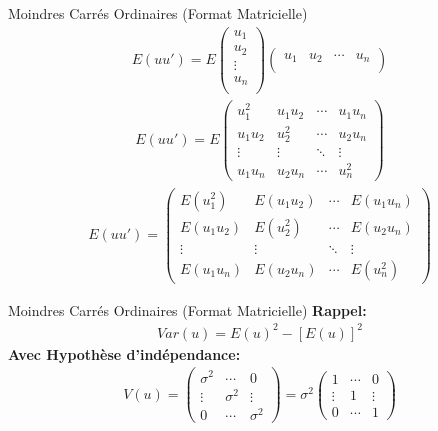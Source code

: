 \documentclass{beamer}
\begin{document}
\begin{frame}{Moindres Carrés Ordinaires (Format Matricielle)}
\begin{align*}
E(uu')=E\begin{pmatrix}
u_1\\ 
u_2\\ 
\vdots\\
u_n\\
\end{pmatrix} \begin{pmatrix}
u_1 &u_2 & \cdots &u_n\\ 
\end{pmatrix}
\end{align*}
\begin{align*}
E(uu')=E\begin{pmatrix}
u_1^2 & u_1 u_2 & \cdots &u_1u_n\\ 
u_1u_2 &u_2^2 & \cdots & u_2u_n\\ 
\vdots & \vdots & \ddots & \vdots \\
u_1u_n & u_2u_n & \cdots & u_n^2
\end{pmatrix} 
\end{align*}
\begin{align*}
E(uu')=\begin{pmatrix}
E(u_1^2) & E(u_1 u_2) & \cdots &E(u_1u_n)\\ 
E(u_1u_2) &E(u_2^2) & \cdots & E(u_2u_n)\\ 
\vdots & \vdots & \ddots & \vdots \\
E(u_1u_n) & E(u_2u_n) & \cdots & E(u_n^2)
\end{pmatrix} 
\end{align*}
\end{frame}

\begin{frame}{Moindres Carrés Ordinaires (Format Matricielle)}
\textbf{Rappel:}
\begin{align*}
Var(u)=E(u)^2-[E(u)]^2
\end{align*}
\textbf{Avec Hypothèse d'indépendance:}
\begin{align*}
V(u)= \begin{pmatrix}
\sigma^2 &\cdots &0 \\ 
\vdots &\sigma^2 & \vdots \\ 
0 & \cdots & \sigma^2
\end{pmatrix} = \sigma^2\begin{pmatrix}
1 &\cdots &0 \\ 
\vdots &1 & \vdots \\ 
0 & \cdots & 1
\end{pmatrix} 
\end{align*}
\end{frame}
\end{document}
